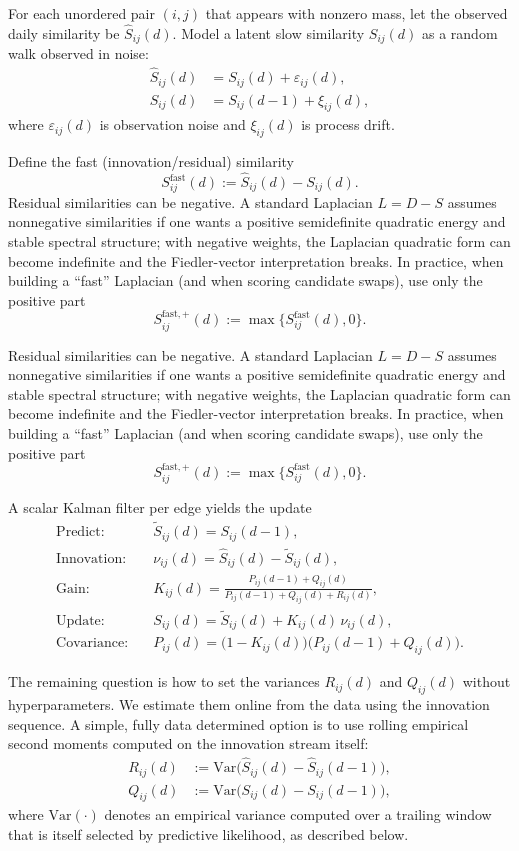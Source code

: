 \documentclass[11pt]{article}
\begin{document}
For each unordered pair $(i,j)$ that appears with nonzero mass, let the observed daily similarity be $\widehat{S}_{ij}(d)$.
Model a latent slow similarity $S_{ij}(d)$ as a random walk observed in noise:
\begin{align}
\widehat{S}_{ij}(d) &= S_{ij}(d) + \varepsilon_{ij}(d), \\
S_{ij}(d) &= S_{ij}(d-1) + \xi_{ij}(d),
\end{align}
where $\varepsilon_{ij}(d)$ is observation noise and $\xi_{ij}(d)$ is process drift.

Define the fast (innovation/residual) similarity
\[
S^{\mathrm{fast}}_{ij}(d):=\widehat{S}_{ij}(d)-S_{ij}(d).
\]
Residual similarities can be negative. A standard Laplacian $L=D-S$ assumes nonnegative similarities if one wants a positive semidefinite quadratic energy and stable spectral structure; with negative weights, the Laplacian quadratic form can become indefinite and the Fiedler-vector interpretation breaks.
In practice, when building a ``fast'' Laplacian (and when scoring candidate swaps), use only the positive part
\[
S^{\mathrm{fast},+}_{ij}(d):=\max\{S^{\mathrm{fast}}_{ij}(d),0\}.
\]

Residual similarities can be negative. A standard Laplacian $L=D-S$ assumes nonnegative similarities if one wants a positive semidefinite quadratic energy and stable spectral structure; with negative weights, the Laplacian quadratic form can become indefinite and the Fiedler-vector interpretation breaks.
In practice, when building a ``fast'' Laplacian (and when scoring candidate swaps), use only the positive part
\[
S^{\mathrm{fast},+}_{ij}(d):=\max\{S^{\mathrm{fast}}_{ij}(d),0\}.
\]

A scalar Kalman filter per edge yields the update
\begin{align}
\text{Predict:}\quad &\widetilde{S}_{ij}(d) = S_{ij}(d-1), \\
\text{Innovation:}\quad &\nu_{ij}(d) = \widehat{S}_{ij}(d)-\widetilde{S}_{ij}(d), \\
\text{Gain:}\quad &K_{ij}(d) = \frac{P_{ij}(d-1)+Q_{ij}(d)}{P_{ij}(d-1)+Q_{ij}(d)+R_{ij}(d)}, \\
\text{Update:}\quad &S_{ij}(d) = \widetilde{S}_{ij}(d) + K_{ij}(d)\,\nu_{ij}(d), \\
\text{Covariance:}\quad &P_{ij}(d) = \bigl(1-K_{ij}(d)\bigr)\bigl(P_{ij}(d-1)+Q_{ij}(d)\bigr).
\end{align}

The remaining question is how to set the variances $R_{ij}(d)$ and $Q_{ij}(d)$ without hyperparameters.
We estimate them online from the data using the innovation sequence.
A simple, fully data determined option is to use rolling empirical second moments computed on the innovation stream itself:
\begin{align}
R_{ij}(d) &:= \mathrm{Var}\bigl(\widehat{S}_{ij}(d)-\widehat{S}_{ij}(d-1)\bigr), \\
Q_{ij}(d) &:= \mathrm{Var}\bigl(S_{ij}(d)-S_{ij}(d-1)\bigr),
\end{align}
where $\mathrm{Var}(\cdot)$ denotes an empirical variance computed over a trailing window that is itself selected by predictive likelihood, as described below.
\end{document}
